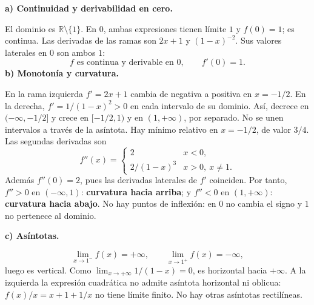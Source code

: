 \textbf{a) Continuidad y derivabilidad en cero.}\par\nopagebreak[4]
El dominio es $\mathbb R\setminus\{1\}$. En $0$, ambas expresiones tienen límite $1$ y $f(0)=1$; es continua. Las derivadas de las ramas son $2x+1$ y $(1-x)^{-2}$. Sus valores laterales en $0$ son ambos $1$:
\[
\boxed{f\text{ es continua y derivable en }0,\qquad f'(0)=1.}
\]
\textbf{b) Monotonía y curvatura.}\par\nopagebreak[4]
En la rama izquierda $f'=2x+1$ cambia de negativa a positiva en $x=-1/2$. En la derecha, $f'=1/(1-x)^2>0$ en cada intervalo de su dominio. Así, decrece en $(-\infty,-1/2]$ y crece en $[-1/2,1)$ y en $(1,+\infty)$, por separado. No se unen intervalos a través de la asíntota. Hay mínimo relativo en $x=-1/2$, de valor $3/4$.
Las segundas derivadas son
\[
f''(x)=\begin{cases}2&x<0,\\2/(1-x)^3&x>0,\ x\ne1.\end{cases}
\]
Además $f''(0)=2$, pues las derivadas laterales de $f'$ coinciden. Por tanto, $f''>0$ en $(-\infty,1)$: \textbf{curvatura hacia arriba}; y $f''<0$ en $(1,+\infty)$: \textbf{curvatura hacia abajo}. No hay puntos de inflexión: en $0$ no cambia el signo y $1$ no pertenece al dominio.

\textbf{c) Asíntotas.}\par\nopagebreak[4]
\[
\lim_{x\to1^-}f(x)=+\infty,\qquad\lim_{x\to1^+}f(x)=-\infty,
\]
luego  es vertical. Como $\lim_{x\to+\infty}1/(1-x)=0$,  es horizontal hacia $+\infty$. A la izquierda la expresión cuadrática no admite asíntota horizontal ni oblicua: $f(x)/x=x+1+1/x$ no tiene límite finito. No hay otras asíntotas rectilíneas.
